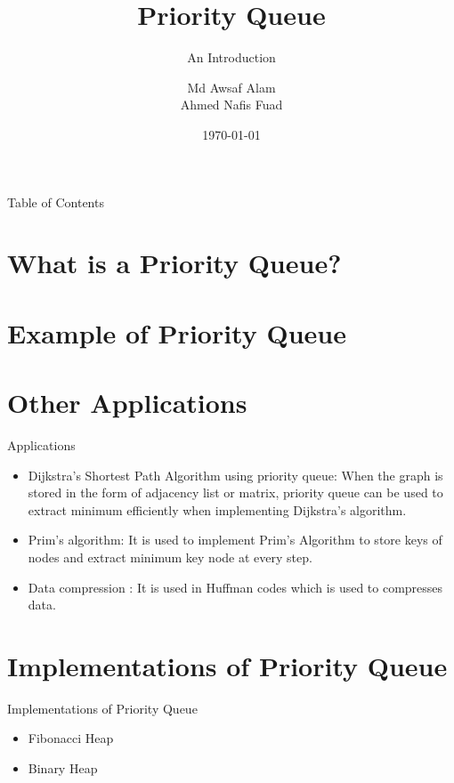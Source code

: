 \documentclass{beamer}
\title[Priority Queue]{Priority Queue}
\subtitle{An Introduction}
\author[A.A. and A.N.F]{Md Awsaf Alam \inst{1} \\ Ahmed Nafis Fuad\inst{2}}
\institute{
\inst{1}
Department of CSE\\
BUET\\
\inst{2}
Department of CSE\\
BUET
}
\date{\today}
\begin{document}
\titlepage

\begin{frame}{Table of Contents}
\tableofcontents

\end{frame}

\section{What is a Priority Queue?}



\section{Example of Priority Queue}


\section{Other Applications}
\begin{frame}{Applications}
\begin{itemize}
  \item  Dijkstra’s Shortest Path Algorithm using priority queue: When the graph is stored in the form of adjacency list or matrix, priority queue can be used to extract minimum efficiently when implementing Dijkstra’s algorithm.
  \item  Prim’s algorithm: It is used to implement Prim’s Algorithm to store keys of nodes and extract minimum key node at every step.
  \item  Data compression : It is used in Huffman codes which is used to compresses data.

\end{itemize}

\end{frame}


\section{Implementations of Priority Queue}
\begin{frame}{Implementations of Priority Queue}
\begin{itemize}
  \item Fibonacci Heap
  \item Binary Heap
\end{itemize}

\end{frame}
\end{document}
